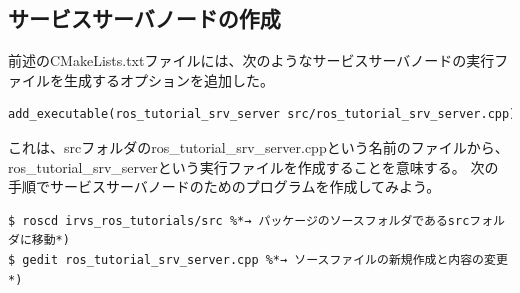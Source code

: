 \subsection{サービスサーバノードの作成}

前述のCMakeLists.txtファイルには、次のようなサービスサーバノードの実行ファイルを生成するオプションを追加した。

\begin{lstlisting}[language=make]
add_executable(ros_tutorial_srv_server src/ros_tutorial_srv_server.cpp)
\end{lstlisting}

これは、srcフォルダのros\_tutorial\_srv\_server.cppという名前のファイルから、 ros\_tutorial\_srv\_serverという実行ファイルを作成することを意味する。
次の手順でサービスサーバノードのためのプログラムを作成してみよう。

\begin{lstlisting}[language=ROS]
$ roscd irvs_ros_tutorials/src %*→ パッケージのソースフォルダであるsrcフォルダに移動*)
$ gedit ros_tutorial_srv_server.cpp %*→ ソースファイルの新規作成と内容の変更*)
\end{lstlisting}

